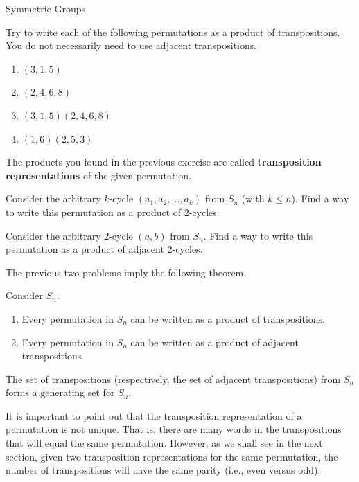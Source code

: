 \begin{section}{Symmetric Groups}
\begin{exercise}
Try to write each of the following permutations as a product of transpositions.  You do not necessarily need to use adjacent transpositions.
\begin{enumerate}[label=\rm{(\alph*)}]
\item $(3,1,5)$
\item $(2,4,6,8)$
\item $(3,1,5)(2,4,6,8)$
\item $(1,6)(2,5,3)$
\end{enumerate}
\end{exercise}

The products you found in the previous exercise are called \textbf{transposition representations} of the given permutation.

\begin{problem}
Consider the arbitrary $k$-cycle $(a_1,a_2,\ldots, a_k)$ from $S_n$ (with $k\leq n$).  Find a way to write this permutation as a product of 2-cycles. 
\end{problem}

\begin{problem}
Consider the arbitrary 2-cycle $(a,b)$ from $S_n$.  Find a way to write this permutation as a product of adjacent 2-cycles.
\end{problem}

The previous two problems imply the following theorem.

\begin{theorem}
Consider $S_n$.
\begin{enumerate}
\item Every permutation in $S_n$ can be written as a product of transpositions.
\item Every permutation in $S_n$ can be written as a product of adjacent transpositions.
\end{enumerate}
\end{theorem}

\begin{corollary}
The set of transpositions (respectively, the set of adjacent transpositions) from $S_n$ forms a generating set for $S_n$.
\end{corollary}

It is important to point out that the transposition representation of a permutation is not unique.  That is, there are many words in the transpositions that will equal the same permutation.  However, as we shall see in the next section, given two transposition representations for the same permutation, the number of transpositions will have the same parity (i.e., even versus odd).


\end{section}
